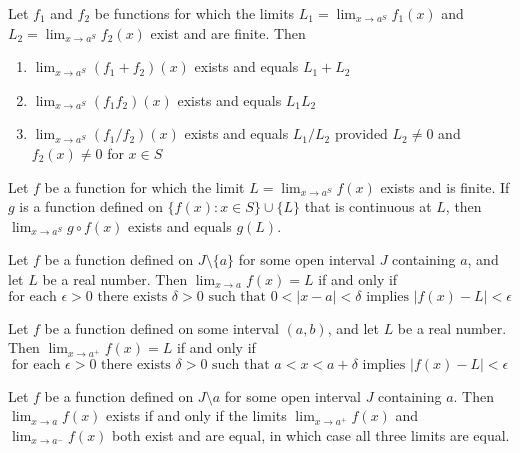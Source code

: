 \documentclass[twoside, 10pt]{article}
\begin{document}
\begin{thm}
Let $f_1$ and $f_2$ be functions for which the limits $L_1 = \lim_{x\to a^S}f_1(x)$ and $L_2=\lim_{x\to a^S}f_2(x)$ exist and are finite. Then
\begin{enumerate}
    \item $\lim_{x\to a^S}(f_1+f_2)(x)$ exists and equals $L_1 + L_2$
    \item $\lim_{x\to a^S}(f_1f_2)(x)$ exists and equals $L_1L_2$
    \item $\lim_{x\to a^S}(f_1/f_2)(x)$ exists and equals $L_1/L_2$ provided $L_2\neq 0$ and $f_2(x)\neq 0$ for $x\in S$
\end{enumerate}
\end{thm}

\begin{thm}
Let $f$ be a function for which the limit $L=\lim_{x\to a^S}f(x)$ exists and is finite. If $g$ is a function defined on $\{f(x): x\in S\}\cup\{L\}$ that is continuous at $L$, then $\lim_{x\to a^S}g\circ f(x)$ exists and equals $g(L)$.
\end{thm}

\begin{cor}
Let $f$ be a function defined on $J\setminus \{a\}$ for some open interval $J$ containing $a$, and let $L$ be a real number. Then $\lim_{x\to a}f(x) = L$ if and only if
\begin{equation*}
    \text{for each $\epsilon > 0$ there exists $\delta > 0 $ such that $0<|x-a|<\delta$ implies $|f(x)-L|<\epsilon$}
\end{equation*}
\end{cor}

\begin{cor}
Let $f$ be a function defined on some interval $(a, b)$, and let $L$ be a real number. Then $\lim_{x\to a^+}f(x) = L$ if and only if
\begin{equation*}
    \text{for each $\epsilon > 0$ there exists $\delta >0$ such that $a < x < a + \delta$ implies $|f(x) - L| < \epsilon$}
\end{equation*}
\end{cor}

\begin{thm}
Let $f$ be a function defined on $J \setminus {a}$ for some open interval $J$ containing $a$. Then $\lim_{x \to a}f(x)$ exists if and only if the limits $\lim_{x \to a^+} f(x)$ and $\lim_{x \to a^-}f(x)$ both exist and are equal, in which case all three limits are equal.
\end{thm}
\end{document}
